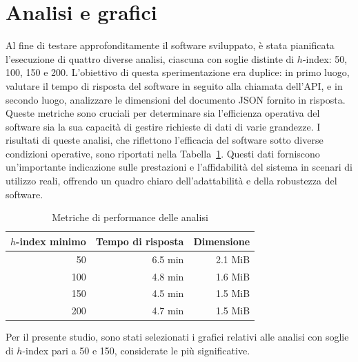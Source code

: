 \section{Analisi e grafici}
Al fine di testare approfonditamente il software sviluppato, è stata pianificata l'esecuzione di quattro diverse analisi, ciascuna con soglie distinte di $h$-index: 50, 100, 150 e 200. L'obiettivo di questa sperimentazione era duplice: in primo luogo, valutare il tempo di risposta del software in seguito alla chiamata dell'API, e in secondo luogo, analizzare le dimensioni del documento JSON fornito in risposta. Queste metriche sono cruciali per determinare sia l'efficienza operativa del software sia la sua capacità di gestire richieste di dati di varie grandezze. I risultati di queste analisi, che riflettono l'efficacia del software sotto diverse condizioni operative, sono riportati nella Tabella~\ref{tab:overview_metrics_performance}. Questi dati forniscono un'importante indicazione sulle prestazioni e l'affidabilità del sistema in scenari di utilizzo reali, offrendo un quadro chiaro dell'adattabilità e della robustezza del software.

\begin{table}[ht]
    \centering
    \begin{tabular}{|r|r|r|}
        \hline
        \textbf{$h$-index minimo} & \textbf{Tempo di risposta} & \textbf{Dimensione} \\
        \hline
        50 & 6.5 min & 2.1 MiB \\
        \hline
        100 & 4.8 min & 1.6 MiB \\
        \hline
        150 & 4.5 min & 1.5 MiB \\
        \hline
        200 & 4.7 min & 1.5 MiB \\
        \hline
    \end{tabular}
    \caption{Metriche di performance delle analisi}
    \label{tab:overview_metrics_performance}
\end{table}

Per il presente studio, sono stati selezionati i grafici relativi alle analisi con soglie di $h$-index pari a 50 e 150, considerate le più significative.

